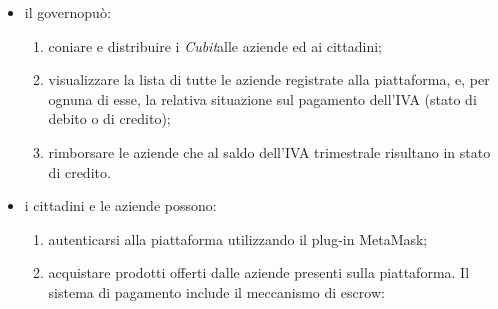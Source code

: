 \begin{itemize}
	\item il governo\glosp può:
	\begin{enumerate}[label=\alph*.]
		\item coniare e distribuire i \textit{Cubit}\glosp alle aziende ed ai cittadini;
		\item visualizzare la lista di tutte le aziende registrate alla piattaforma, e, per ognuna di esse, la relativa situazione sul pagamento dell'IVA (stato di debito o di credito); 
		\item rimborsare le aziende che al saldo dell'IVA trimestrale risultano in stato di credito.
	\end{enumerate}
	\item i cittadini e le aziende possono:
	\begin{enumerate}[label=\alph*.]
		\item autenticarsi alla piattaforma utilizzando il plug-in MetaMask\glo;
		\item acquistare prodotti offerti dalle aziende presenti sulla piattaforma. Il sistema di pagamento include il meccanismo di escrow\glo:
		

\end{enumerate}
\end{itemize}
